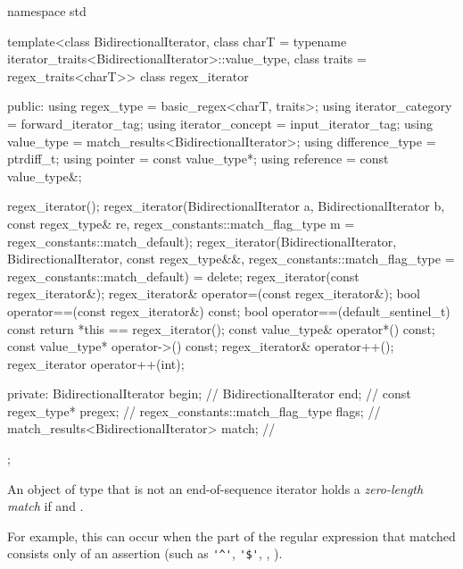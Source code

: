 \begin{codeblock}
namespace std {
  template<class BidirectionalIterator,
           class charT = typename iterator_traits<BidirectionalIterator>::value_type,
           class traits = regex_traits<charT>>
    class regex_iterator {
    public:
      using regex_type        = basic_regex<charT, traits>;
      using iterator_category = forward_iterator_tag;
      using iterator_concept  = input_iterator_tag;
      using value_type        = match_results<BidirectionalIterator>;
      using difference_type   = ptrdiff_t;
      using pointer           = const value_type*;
      using reference         = const value_type&;

      regex_iterator();
      regex_iterator(BidirectionalIterator a, BidirectionalIterator b,
                     const regex_type& re,
                     regex_constants::match_flag_type m = regex_constants::match_default);
      regex_iterator(BidirectionalIterator, BidirectionalIterator,
                     const regex_type&&,
                     regex_constants::match_flag_type = regex_constants::match_default) = delete;
      regex_iterator(const regex_iterator&);
      regex_iterator& operator=(const regex_iterator&);
      bool operator==(const regex_iterator&) const;
      bool operator==(default_sentinel_t) const { return *this == regex_iterator(); }
      const value_type& operator*() const;
      const value_type* operator->() const;
      regex_iterator& operator++();
      regex_iterator operator++(int);

    private:
      BidirectionalIterator                begin;               // \expos
      BidirectionalIterator                end;                 // \expos
      const regex_type*                    pregex;              // \expos
      regex_constants::match_flag_type     flags;               // \expos
      match_results<BidirectionalIterator> match;               // \expos
    };
}
\end{codeblock}

\pnum
An object of type  that is not an end-of-sequence iterator
holds a \textit{zero-length match} if  and
.
\begin{note}
For
example, this can occur when the part of the regular expression that
matched consists only of an assertion (such as \verb|'^'|, \verb|'$'|,
, ).
\end{note}

